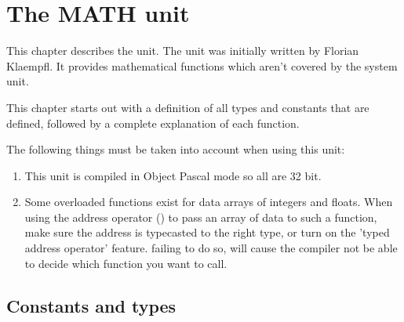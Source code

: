 %
%
%
%
%
\chapter{The MATH unit}

This chapter describes the  unit. The  unit
was initially written by Florian Klaempfl. It provides mathematical
functions which aren't covered by the system unit.

This chapter starts out with a definition of all types and constants
that are defined, followed by a complete explanation of each function.

The following things must be taken into account when using this unit:
\begin{enumerate}
\item This unit is compiled in Object Pascal mode so all
 are 32 bit.
\item Some overloaded functions exist for data arrays of integers and
floats. When using the address operator () to pass an array of 
data to such a function, make sure the address is typecasted to the 
right type, or turn on the 'typed address operator' feature. failing to
do so, will cause the compiler not be able to decide which function you 
want to call.
\end{enumerate}

\section{Constants and types}


